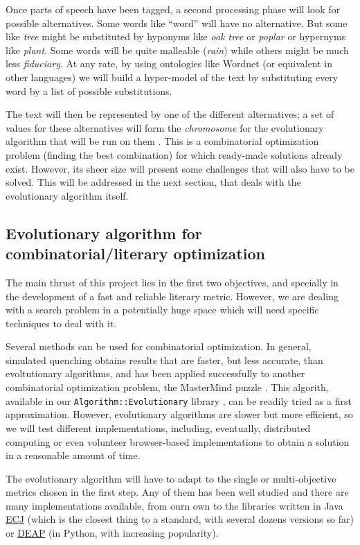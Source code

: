 \documentclass[a4paper,12pt,twocolumn]{article}
\begin{document}
Once parts of speech have been tagged, a second processing phase will
look for possible alternatives. Some words like ``word'' will have no
alternative. But some like {\em tree} might be substituted by hyponyms
like {\em oak tree} or {\em poplar} or hypernyms like {\em plant}.
Some words will be quite malleable ({\em rain}) while others might be
much less {\em fiduciary}. At any rate, by using ontologies like
Wordnet (or equivalent in other languages) we will build a hyper-model
of the text by substituting every word by a list of possible
substitutions.

The text will then be represented by one of the different
alternatives; a set of values for these alternatives will form the
{\em chromosome} for the evolutionary algorithm that will be run on
them \cite{eiben2002evolutionary}. This is a combinatorial
optimization problem (finding the best combination) for which
ready-made solutions already exist. However, its sheer size will
present some challenges that will also have to be solved. This will be
addressed in the next section, that deals with the evolutionary
algorithm itself.

\subsection{Evolutionary algorithm for combinatorial/literary optimization}

The main thrust of this project lies in the first two objectives, and
specially in the development of a fast and reliable literary
metric. However, we are dealing with a search problem in a potentially
huge space which will need specific techniques to deal with it.

Several methods can be used for combinatorial optimization. In
general, simulated quenching
\cite{DBLP:journals/apin/CastilloARMGLG12} obtains results that are
faster, but less accurate, than evoltutionary algorithms, and has been
applied successfully to another combinatorial optimization problem,
the MasterMind puzzle \cite{jj-ppsn96}. This algorith, available in
our {\tt Algorithm::Evolutionary} library \cite{ae09}, can be readily
tried as a first approximation. However, evolutionary algorithms are
slower but more efficient, so we will test different implementations,
including, eventually, distributed computing or even volunteer
browser-based implementations \cite{gecco07:workshop:dcor,} to obtain
a solution in a reasonable amount of time. 

The evolutionary algorithm will have to adapt to the single or
multi-objective metrics chosen in the first step. Any of them has been
well studied and there are many implementations available, from ourn
own to the libraries written in Java \href{DBLP:conf/iwann/MereloRACML11}{ECJ} (which is the closest thing
to a standard, with several dozens versions so far) or \href{http://code.google.com/p/deap/}{DEAP} (in
Python, with increasing popularity). 
\end{document}

